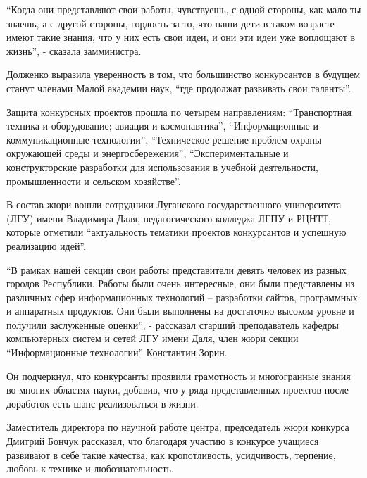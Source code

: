 
\enquote{Когда они представляют свои работы, чувствуешь, с одной стороны, как мало ты
знаешь, а с другой стороны, гордость за то, что наши дети в таком возрасте
имеют такие знания, что у них есть свои идеи, и они эти идеи уже воплощают в
жизнь}, - сказала замминистра.


Долженко выразила уверенность в том, что большинство конкурсантов в будущем
станут членами Малой академии наук, \enquote{где продолжат развивать свои таланты}.


Защита конкурсных проектов прошла по четырем направлениям: \enquote{Транспортная
техника и оборудование; авиация и космонавтика}, \enquote{Информационные и
коммуникационные технологии}, \enquote{Техническое решение проблем охраны окружающей
среды и энергосбережения}, \enquote{Экспериментальные и конструкторские разработки для
использования в учебной деятельности, промышленности и сельском хозяйстве}.


В состав жюри вошли сотрудники Луганского государственного университета (ЛГУ)
имени Владимира Даля, педагогического колледжа ЛГПУ и РЦНТТ, которые отметили
\enquote{актуальность тематики проектов конкурсантов и успешную реализацию идей}.


\enquote{В рамках нашей секции свои работы представители девять человек из разных
городов Республики. Работы были очень интересные, они были представлены из
различных сфер информационных технологий – разработки сайтов, программных и
аппаратных продуктов. Они были выполнены на достаточно высоком уровне и
получили заслуженные оценки}, - рассказал старший преподаватель кафедры
компьютерных систем и сетей ЛГУ имени Даля, член жюри секции \enquote{Информационные
технологии} Константин Зорин.

Он подчеркнул, что конкурсанты проявили грамотность и многогранные знания во
многих областях науки, добавив, что у ряда представленных проектов после
доработок есть шанс реализоваться в жизни.

Заместитель директора по научной работе центра, председатель жюри конкурса
Дмитрий Бончук рассказал, что благодаря участию в конкурсе учащиеся развивают в
себе такие качества, как кропотливость, усидчивость, терпение, любовь к технике
и любознательность.

